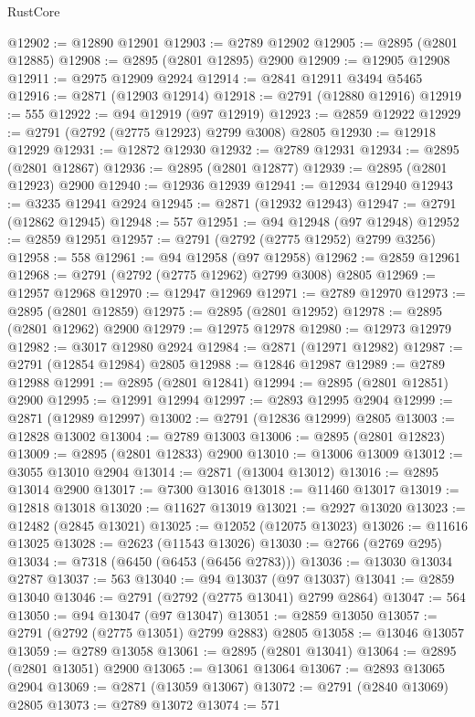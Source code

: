 \begin{lexlean}{RustCore}
\begin{coremodule}
@12902 := @12890 @12901
@12903 := @2789 @12902
@12905 := @2895 (@2801 @12885)
@12908 := @2895 (@2801 @12895) @2900
@12909 := @12905 @12908
@12911 := @2975 @12909 @2924
@12914 := @2841 @12911 @3494 @5465
@12916 := @2871 (@12903 @12914)
@12918 := @2791 (@12880 @12916)
@12919 := 555
@12922 := @94 @12919 (@97 @12919)
@12923 := @2859 @12922
@12929 := @2791 (@2792 (@2775 @12923) @2799 @3008) @2805
@12930 := @12918 @12929
@12931 := @12872 @12930
@12932 := @2789 @12931
@12934 := @2895 (@2801 @12867)
@12936 := @2895 (@2801 @12877)
@12939 := @2895 (@2801 @12923) @2900
@12940 := @12936 @12939
@12941 := @12934 @12940
@12943 := @3235 @12941 @2924
@12945 := @2871 (@12932 @12943)
@12947 := @2791 (@12862 @12945)
@12948 := 557
@12951 := @94 @12948 (@97 @12948)
@12952 := @2859 @12951
@12957 := @2791 (@2792 (@2775 @12952) @2799 @3256)
@12958 := 558
@12961 := @94 @12958 (@97 @12958)
@12962 := @2859 @12961
@12968 := @2791 (@2792 (@2775 @12962) @2799 @3008) @2805
@12969 := @12957 @12968
@12970 := @12947 @12969
@12971 := @2789 @12970
@12973 := @2895 (@2801 @12859)
@12975 := @2895 (@2801 @12952)
@12978 := @2895 (@2801 @12962) @2900
@12979 := @12975 @12978
@12980 := @12973 @12979
@12982 := @3017 @12980 @2924
@12984 := @2871 (@12971 @12982)
@12987 := @2791 (@12854 @12984) @2805
@12988 := @12846 @12987
@12989 := @2789 @12988
@12991 := @2895 (@2801 @12841)
@12994 := @2895 (@2801 @12851) @2900
@12995 := @12991 @12994
@12997 := @2893 @12995 @2904
@12999 := @2871 (@12989 @12997)
@13002 := @2791 (@12836 @12999) @2805
@13003 := @12828 @13002
@13004 := @2789 @13003
@13006 := @2895 (@2801 @12823)
@13009 := @2895 (@2801 @12833) @2900
@13010 := @13006 @13009
@13012 := @3055 @13010 @2904
@13014 := @2871 (@13004 @13012)
@13016 := @2895 @13014 @2900
@13017 := @7300 @13016
@13018 := @11460 @13017
@13019 := @12818 @13018
@13020 := @11627 @13019
@13021 := @2927 @13020
@13023 := @12482 (@2845 @13021)
@13025 := @12052 (@12075 @13023)
@13026 := @11616 @13025
@13028 := @2623 (@11543 @13026)
@13030 := @2766 (@2769 @295)
@13034 := @7318 (@6450 (@6453 (@6456 @2783)))
@13036 := @13030 @13034 @2787
@13037 := 563
@13040 := @94 @13037 (@97 @13037)
@13041 := @2859 @13040
@13046 := @2791 (@2792 (@2775 @13041) @2799 @2864)
@13047 := 564
@13050 := @94 @13047 (@97 @13047)
@13051 := @2859 @13050
@13057 := @2791 (@2792 (@2775 @13051) @2799 @2883) @2805
@13058 := @13046 @13057
@13059 := @2789 @13058
@13061 := @2895 (@2801 @13041)
@13064 := @2895 (@2801 @13051) @2900
@13065 := @13061 @13064
@13067 := @2893 @13065 @2904
@13069 := @2871 (@13059 @13067)
@13072 := @2791 (@2840 @13069) @2805
@13073 := @2789 @13072
@13074 := 571

\end{coremodule}
\end{lexlean}
